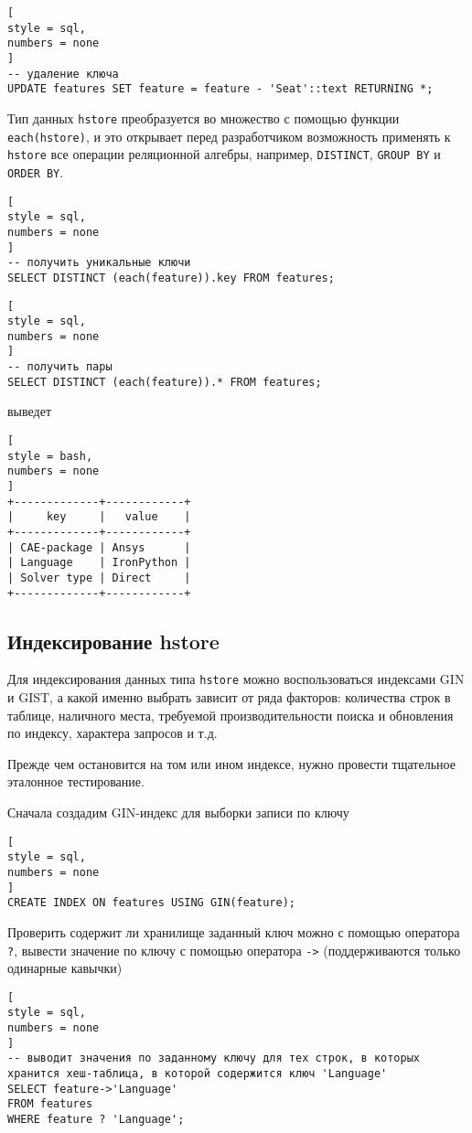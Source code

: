 \documentclass[%
	11pt,
	a4paper,
	utf8,
		]{article}
\begin{document}
\begin{lstlisting}[
style = sql,
numbers = none
]
-- удаление ключа
UPDATE features SET feature = feature - 'Seat'::text RETURNING *;
\end{lstlisting}

Тип данных \texttt{hstore} преобразуется во множество с помощью функции \texttt{each(hstore)}, и это открывает перед разработчиком возможность применять к \texttt{hstore} все операции реляционной алгебры, например, \texttt{DISTINCT}, \texttt{GROUP BY} и \texttt{ORDER BY}.

\begin{lstlisting}[
style = sql,
numbers = none
]
-- получить уникальные ключи
SELECT DISTINCT (each(feature)).key FROM features;
\end{lstlisting}

\begin{lstlisting}[
style = sql,
numbers = none
]
-- получить пары
SELECT DISTINCT (each(feature)).* FROM features;
\end{lstlisting}
выведет
\begin{lstlisting}[
style = bash,
numbers = none
]
+-------------+------------+
|     key     |   value    |
+-------------+------------+
| CAE-package | Ansys      |
| Language    | IronPython |
| Solver type | Direct     |
+-------------+------------+
\end{lstlisting}

\subsection{Индексирование hstore}

Для индексирования данных типа \texttt{hstore} можно воспользоваться индексами GIN и GIST, а какой именно выбрать зависит от ряда факторов: количества строк в таблице, наличного места, требуемой производительности поиска и обновления по индексу, характера запросов и т.д. 

Прежде чем остановится на том или ином индексе, нужно провести тщательное эталонное тестирование.

Сначала создадим GIN-индекс для выборки записи по ключу
\begin{lstlisting}[
style = sql,
numbers = none
]
CREATE INDEX ON features USING GIN(feature);
\end{lstlisting}

Проверить содержит ли хранилище заданный ключ можно с помощью оператора \verb|?|, вывести значение по ключу с помощью оператора \verb|->| (поддерживаются только одинарные кавычки)
\begin{lstlisting}[
style = sql,
numbers = none
]
-- выводит значения по заданному ключу для тех строк, в которых хранится хеш-таблица, в которой содержится ключ 'Language'
SELECT feature->'Language'
FROM features
WHERE feature ? 'Language';
\end{lstlisting}
\end{document}
